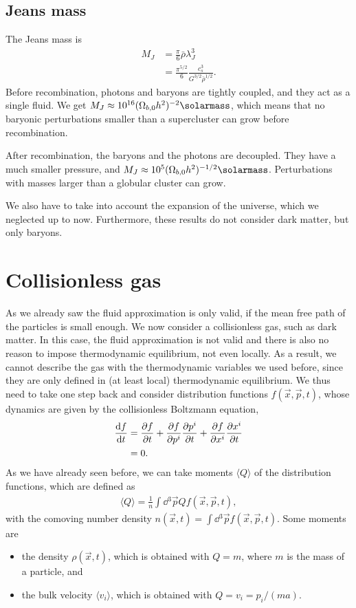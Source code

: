 
\subsection{Jeans mass}
The Jeans mass is
\begin{align*}
	M_J
	&= \frac{\pi}{6} \bar{\rho} \lambda_J^3\\
	&= \frac{\pi^{5/2}}{6} \frac{c_s^3}{G^{3/2} \bar{\rho}^{1/2}}.
\end{align*}
Before recombination, photons and baryons are tightly coupled, and they act as a single fluid. We get $M_J \approx \num{e16} (\Omega_{b,0}h^2)^{-2} \si{\solarmass}$, which means that no baryonic perturbations smaller than a supercluster can grow before recombination.

After recombination, the baryons and the photons are decoupled. They have a much smaller pressure, and $M_J \approx \num{e5} (\Omega_{b,0}h^2)^{-1/2} \si{\solarmass}$. Perturbations with masses larger than a globular cluster can grow.

We also have to take into account the expansion of the universe, which we neglected up to now. Furthermore, these results do not consider dark matter, but only baryons.


\section{Collisionless gas}
\label{sec:collisionless-gas}

As we already saw the fluid approximation is only valid, if the mean free path of the particles is small enough. We now consider a collisionless gas, such as dark matter. In this case, the fluid approximation is not valid and there is also no reason to impose thermodynamic equilibrium, not even locally. As a result, we cannot describe the gas with the thermodynamic variables we used before, since they are only defined in (at least local) thermodynamic equilibrium. We thus need to take one step back and consider distribution functions $f(\vec{x}, \vec{p}, t)$, whose dynamics are given by the collisionless Boltzmann equation,
\begin{align*}
	\dv{f}{t}
	&= \pdv{f}{t} + \pdv{f}{p^i} \pdv{p^i}{t} + \pdv{f}{x^i} \pdv{x^i}{t}\\
	&= 0.
\end{align*}
As we have already seen before, we can take moments $\langle Q \rangle$ of the distribution functions, which are defined as
\begin{align*}
	\langle Q \rangle = \frac{1}{n} \int \dd{^3\vec{p}} Q f(\vec{x}, \vec{p}, t),
\end{align*}
with the comoving number density $n(\vec{x}, t) = \int \dd{^3\vec{p}} f(\vec{x}, \vec{p}, t)$.
Some moments are
\begin{itemize}
	\item the density $\rho(\vec{x}, t)$, which is obtained with $Q = m$, where $m$ is the mass of a particle, and
	\item the bulk velocity $\langle v_i \rangle$, which is obtained with $Q = v_i = p_i/(m a)$.
\end{itemize}

